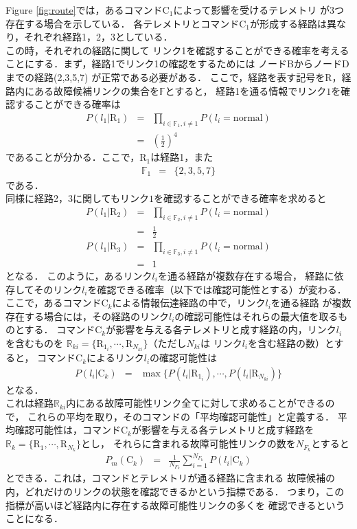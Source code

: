 \documentclass[11pt]{article}
\begin{document}
Figure \ref{fig:route}では，あるコマンドC$_1$によって影響を受けるテレメトリ
が3つ存在する場合を示している．
各テレメトリとコマンドC$_1$が形成する経路は異なり，それぞれ経路1，2，3としている．\\
この時，それぞれの経路に関して
リンク1を確認することができる確率を考えることにする．まず，経路1でリンク1の確認をするためには
ノードBからノードDまでの経路(2,3,5,7)
が正常である必要がある．%
ここで，経路を表す記号をR，経路内にある故障候補リンクの集合を$\mathbb{F}$とすると，
経路1を通る情報でリンク$1$を確認することができる確率は
\begin{eqnarray}
   P(l_{1} | \text{R}_1) &=& \prod_{i\in\mathbb{F}_1,i\neq 1} P(l_{i} = \text{normal})\\
     &=& \left( \frac{1}{2}\right)^4
\end{eqnarray}
であることが分かる．ここで，R$_1$は経路1，また
\begin{eqnarray}
   \mathbb{F}_1  &=& \{ 2,3,5,7\} 
\end{eqnarray}
である．\\
同様に経路2，3に関してもリンク$1$を確認することができる確率を求めると
\begin{eqnarray}
   P(l_{1} | \text{R}_2)  &=& \prod_{i\in\mathbb{F}_2,i\neq 1} P(l_{i} = \text{normal})\\
   &=& \frac{1}{2}\\
   P(l_{1} | \text{R}_3)  &=& \prod_{i\in\mathbb{F}_3,i\neq 1} P(l_{i} = \text{normal})\\
   &=& 1
\end{eqnarray}
となる．
このように，あるリンク$l_i$を通る経路が複数存在する場合，
経路に依存してそのリンク$l_i$を確認できる確率（以下では確認可能性とする）が変わる．
ここで，あるコマンドC$_k$による情報伝達経路の中で，リンク$l_i$を通る経路
が複数存在する場合には，その経路のリンク$l_i$の確認可能性はそれらの最大値を取るものとする．
コマンドC$_k$が影響を与える各テレメトリと成す経路の内，リンク$l_i$を含むものを
$\mathbb{R}_{ki} = \{ \text{R}_{1_i}, \cdots ,\text{R}_{N_{ki}} \}$（ただし$N_{ki}$は
リンク$l_i$を含む経路の数）とすると，
コマンドC$_k$によるリンク$l_i$の確認可能性は
\begin{eqnarray}
   P(l_i|\text{C}_k) &=& \max  \{ P(l_i|\text{R}_{1_i}), \cdots ,P(l_i|\text{R}_{N_{ki}}) \}
\end{eqnarray}
となる．\\
これは経路$\mathbb{R}_{ki}$内にある故障可能性リンク全てに対して求めることができるので，
これらの平均を取り，そのコマンドの「平均確認可能性」と定義する．
平均確認可能性は，コマンドC$_k$が影響を与える各テレメトリと成す経路を
$\mathbb{R}_{k} = \{ \text{R}_{1}, \cdots ,\text{R}_{N_{k}} \}$とし，
それらに含まれる故障可能性リンクの数を$N_{F_k}$とすると
\begin{eqnarray}
   P_m(\text{C}_k) &=& \frac{1}{N_{F_k}}\sum_{i=1}^{N_{F_k}}P(l_i|\text{C}_k)
\end{eqnarray} %
とできる．これは，コマンドとテレメトリが通る経路に含まれる
故障候補の内，どれだけのリンクの状態を確認できるかという指標である．
つまり，この指標が高いほど経路内に存在する故障可能性リンクの多くを
確認できるということになる．%
\end{document}
